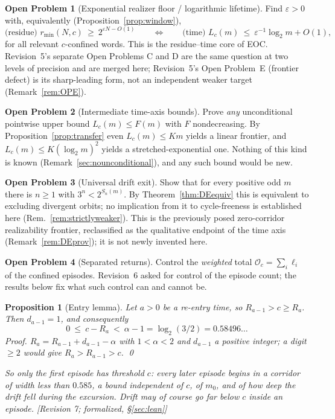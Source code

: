 \documentclass[11pt]{article}
\theoremstyle{plain}
\newtheorem{proposition}[theorem]{Proposition}
\theoremstyle{definition}
\newtheorem{openproblem}{Open Problem}
\theoremstyle{remark}
\newcommand{\Occ}{\mathcal{O}}
\newcommand{\al}{\alpha}
\newcommand{\rmin}{r_{\min}}
\newcommand{\status}[1]{\textsf{\footnotesize[#1]}}
\begin{document}
\begin{openproblem}[Exponential realizer floor / logarithmic lifetime]\label{op:C}
Find $\varepsilon>0$ with, equivalently (Proposition~\ref{prop:window}),
\[
\text{(residue) } \rmin(N,c)\ \ge\ 2^{\varepsilon N-O(1)}
\qquad\Longleftrightarrow\qquad
\text{(time) } L_c(m)\ \le\ \varepsilon^{-1}\log_2 m+O(1),
\]
for all relevant $c$-confined words. This is the residue--time core of EOC. Revision~5's separate
Open Problems C and D are the same question at two levels of precision and are merged here;
Revision~5's Open Problem~E (frontier defect) is its sharp-leading form, not an independent weaker
target (Remark~\ref{rem:OPE}).
\end{openproblem}

\begin{openproblem}[Intermediate time-axis bounds]\label{op:intermediate}
Prove \emph{any} unconditional pointwise upper bound $L_c(m)\le F(m)$ with $F$ nondecreasing. By
Proposition~\ref{prop:transfer} even $L_c(m)\le Km$ yields a linear frontier, and
$L_c(m)\le K(\log_2 m)^2$ yields a stretched-exponential one. Nothing of this kind is known
(Remark~\ref{sec:nounconditional}), and any such bound would be new.
\end{openproblem}

\begin{openproblem}[Universal drift exit]\label{op:DE}
Show that for every positive odd $m$ there is $n\ge1$ with $3^n<2^{S_n(m)}$. By
Theorem~\ref{thm:DEequiv} this is equivalent to excluding divergent orbits; no implication from it
to cycle-freeness is established here (Rem.~\ref{rem:strictlyweaker}). This is the previously posed zero-corridor realizability frontier, reclassified as
the qualitative endpoint of the time axis (Remark~\ref{rem:DEprov}); it is not newly invented here.
\end{openproblem}

\begin{openproblem}[Separated returns]\label{op:F}
Control the \emph{weighted} total $\Occ_c=\sum_i\ell_i$ of the confined episodes. Revision~6 asked
for control of the episode count; the results below fix what such control can and cannot be.
\end{openproblem}

\begin{proposition}[Entry lemma]\label{prop:entry}
Let $a>0$ be a re-entry time, so $R_{a-1}>c\ge R_a$. Then $d_{a-1}=1$, and consequently
\[
0\ \le\ c-R_a\ <\ \al-1=\log_2(3/2)=0.58496\ldots
\]
\emph{Proof.} $R_a=R_{a-1}+d_{a-1}-\al$ with $1<\al<2$ and $d_{a-1}$ a positive integer; a digit
$\ge2$ would give $R_a>R_{a-1}>c$. \qed

So only the \emph{first} episode has threshold $c$: every later episode begins in a corridor of
width less than $0.585$, a bound independent of $c$, of $m_0$, and of how deep the drift fell
during the excursion. Drift may of course go far below $c$ \emph{inside} an episode.
\status{Revision 7; formalized, \S\ref{sec:lean}}
\end{proposition}
\end{document}

